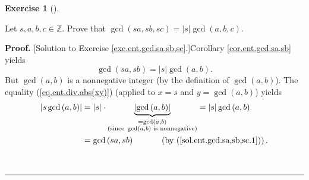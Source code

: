 \documentclass[numbers=enddot,12pt,final,onecolumn,notitlepage]{scrartcl}%
\newcounter{exer}
\numberwithin{exer}{subsection}
\theoremstyle{definition}
\newtheorem{exmp}[exer]{Exercise}
\newenvironment{exercise}[1][]
{\begin{exmp}[#1]\begin{leftbar}}
{\end{leftbar}\end{exmp}}
\newenvironment{fineprint}{\begin{small}}{\end{small}}
\newenvironment{proof}[1][Proof]{\noindent\textbf{#1.} }{\ \rule{0.5em}{0.5em}}
\begin{document}
\begin{exercise}
\label{exe.ent.gcd.sa,sb,sc}Let $s,a,b,c\in\mathbb{Z}$. Prove that
$\gcd\left(  sa,sb,sc\right)  =\left\vert s\right\vert \gcd\left(
a,b,c\right)  $.
\end{exercise}

\begin{fineprint}
\begin{proof}
[Solution to Exercise \ref{exe.ent.gcd.sa,sb,sc}.]Corollary
\ref{cor.ent.gcd.sa,sb} yields
\begin{equation}
\gcd\left(  sa,sb\right)  =\left\vert s\right\vert \gcd\left(  a,b\right)  .
\label{sol.ent.gcd.sa,sb,sc.1}%
\end{equation}
But $\gcd\left(  a,b\right)  $ is a nonnegative integer (by the definition of
$\gcd\left(  a,b\right)  $). The equality (\ref{eq.ent.div.abs(xy)}) (applied
to $x=s$ and $y=\gcd\left(  a,b\right)  $) yields%
\begin{align}
\left\vert s\gcd\left(  a,b\right)  \right\vert  &  =\left\vert s\right\vert
\cdot\underbrace{\left\vert \gcd\left(  a,b\right)  \right\vert }%
_{\substack{=\gcd\left(  a,b\right)  \\\text{(since }\gcd\left(  a,b\right)
\text{ is nonnegative)}}}=\left\vert s\right\vert \gcd\left(  a,b\right)
\nonumber\\
&  =\gcd\left(  sa,sb\right)  \ \ \ \ \ \ \ \ \ \ \left(  \text{by
(\ref{sol.ent.gcd.sa,sb,sc.1})}\right)  . \label{sol.ent.gcd.sa,sb,sc.2}%
\end{align}



\end{proof}
\end{fineprint}
\end{document}
